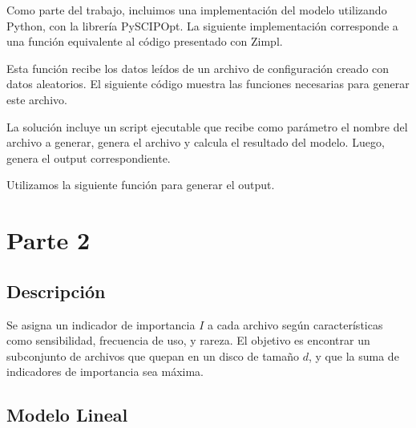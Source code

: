 \documentclass[11pt, a4paper, pdftex]{article}
\begin{document}
Como parte del trabajo, incluimos una implementación del modelo utilizando
Python, con la librería PySCIPOpt. La siguiente implementación corresponde 
a una función equivalente al código presentado con Zimpl.



\newpage

Esta función recibe los datos leídos de un archivo de configuración creado 
con datos aleatorios. El siguiente código muestra las funciones necesarias para generar este archivo.





La solución incluye un script ejecutable que recibe como parámetro el nombre del 
archivo a generar, genera el archivo y calcula el resultado del modelo. Luego, 
genera el output correspondiente.



\newpage

Utilizamos la siguiente función para generar el output.



\newpage
\section{Parte 2}

\subsection{Descripción}

Se asigna un indicador de importancia $I$ a cada archivo según
características como sensibilidad, frecuencia de uso, y rareza. El
objetivo es encontrar un subconjunto de archivos que quepan en un disco
de tamaño $d$, y que la suma de indicadores de importancia sea máxima.

\subsection{Modelo Lineal}
\end{document}
